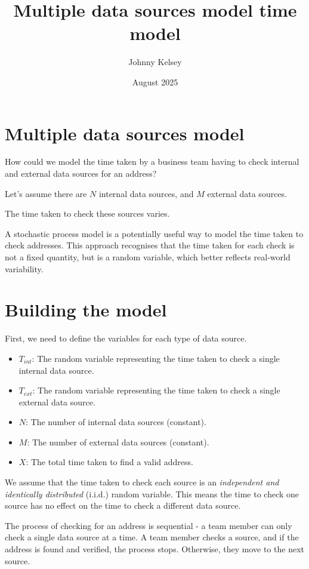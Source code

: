 \documentclass{article}
\title{Multiple data sources model time model}
\author{Johnny Kelsey }
\date{August 2025}
\begin{document}
\maketitle

\section{Multiple data sources model}

How could we model the time taken by a business team having to check internal and external data sources for an address?

Let's assume there are $N$ internal data sources, and $M$ external data sources.

The time taken to check these sources varies.

A stochastic process model is a potentially useful way to model the time taken to check addresses. This approach recognises that the time taken for each check is not a fixed quantity, but is a random variable, which better reflects real-world variability.

\section{Building the model}

First, we need to define the variables for each type of data source.

\begin{itemize}
    \item $T_{int}$: The random variable representing the time taken to check a single internal data source.
    \item $T_{ext}$: The random variable representing the time taken to check a single external data source.
    \item $N$: The number of internal data sources (constant).
    \item $M$: The number of external data sources (constant).
    \item $X$: The total time taken to find a valid address.
\end{itemize}

We assume that the time taken to check each source is an \emph{independent and identically distributed} (i.i.d.) random variable. This means the time to check one source has no effect on the time to check a different data source.

The process of checking for an address is sequential - a team member can only check a single data source at a time. A team member checks a source, and if the address is found and verified, the process stops. Otherwise, they move to the next source.
\end{document}
